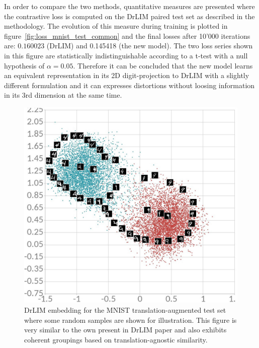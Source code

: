\documentclass[a4paper,12pt]{report}
\begin{document}
In order to compare the two methods, quantitative measures are presented where the contrastive loss is computed on the DrLIM paired test set as described in the methodology.
The evolution of this measure during training is plotted in figure~\ref{fig:loss_mnist_test_common} and the final losses after 10'000 iterations are: $0.160023$ (DrLIM) and 0.145418 (the new model).
The two loss series shown in this figure are statistically indistinguishable according to a t-test with a null hypothesis of $\alpha = 0.05$.
Therefore it can be concluded that the new model learns an equivalent representation in its 2D digit-projection to DrLIM with a slightly different formulation and it can expresses distortions without loosing information in its 3rd dimension at the same time.

\begin{figure}[h]
    \centering
    \includegraphics{thesis_figures/mnist_cl_drlim.jpg}
    \caption{DrLIM embedding for the MNIST translation-augmented test set where some random samples are shown for illustration.
    This figure is very similar to the own present in DrLIM paper and also exhibits coherent groupings based on translation-agnostic similarity.
    }
    \label{fig:mnist_cl_drlim}
\end{figure}
\end{document}
